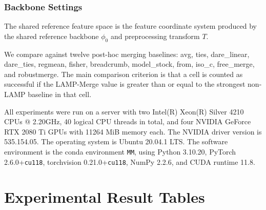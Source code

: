 \documentclass[letterpaper]{article}
\begin{document}
\subsubsection{Backbone Settings}

The shared reference feature space is the feature coordinate system produced by the shared reference backbone $\phi_0$ and preprocessing transform $T$.


We compare against twelve post-hoc merging baselines: avg, ties, dare\_linear, dare\_ties, regmean, fisher, breadcrumb, model\_stock, from, iso\_c, free\_merge, and robustmerge. The main comparison criterion is that a cell is counted as successful if the LAMP-Merge value is greater than or equal to the strongest non-LAMP baseline in that cell.


All experiments were run on a server with two Intel(R) Xeon(R) Silver 4210 CPUs @ 2.20GHz, 40 logical CPU threads in total, and four NVIDIA GeForce RTX 2080 Ti GPUs with 11264 MiB memory each. The NVIDIA driver version is 535.154.05. The operating system is Ubuntu 20.04.1 LTS. The software environment is the conda environment \texttt{MM}, using Python 3.10.20, PyTorch 2.6.0+\texttt{cu118}, torchvision 0.21.0+\texttt{cu118}, NumPy 2.2.6, and CUDA runtime 11.8.


\section{Experimental Result Tables}

\end{document}
